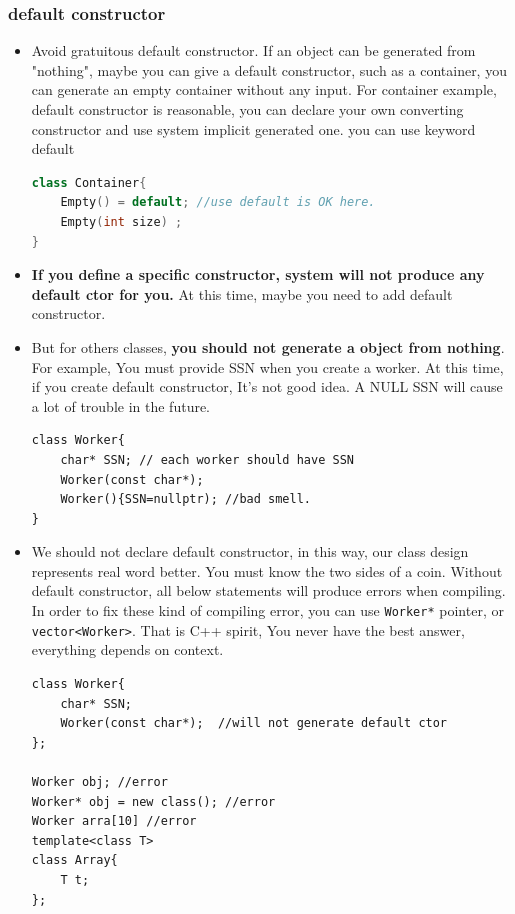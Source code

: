 \documentclass[a4paper,11pt,twoside]{book}
\begin{document}
\subsubsection{default constructor}
\begin{itemize}
	
	\item Avoid gratuitous default constructor. If an object can be generated from "nothing", maybe you can give a default constructor, such as a container, you can generate an empty container without any input. For container example, default constructor is reasonable, you can declare your own converting constructor and use system implicit generated one. you can use keyword default
\begin{lstlisting}[frame=single, language=c++]
class Container{
	Empty() = default; //use default is OK here.
	Empty(int size) ;
}	
\end{lstlisting}

	\item \textbf{If you define a specific constructor, system will not produce any default ctor for you.} At this time, maybe you need to add default constructor.
		
	\item But for others classes, \textbf{you should not generate a object from nothing}. For example, You must provide SSN when you create a worker. At this time, if you create default constructor, It's not good idea. A NULL SSN will cause a lot of trouble in the future. 
\begin{lstlisting}[numbers=none]
class Worker{
	char* SSN; // each worker should have SSN
	Worker(const char*);
	Worker(){SSN=nullptr); //bad smell.
}
\end{lstlisting}
	
	\item We should not declare default constructor, in this way, our class design represents real word better. You must know the two sides of a coin. Without default constructor, all below statements will produce errors when compiling. In order to fix these kind of compiling error, you can use \texttt{Worker*} pointer, or \texttt{vector<Worker>}. That is C++ spirit, You never have the best answer, everything depends on context. 
	
\begin{lstlisting}
class Worker{
	char* SSN;
	Worker(const char*);  //will not generate default ctor
};

Worker obj; //error
Worker* obj = new class(); //error
Worker arra[10] //error
template<class T>
class Array{
	T t;
};


\end{lstlisting}
\end{itemize}
\end{document}
